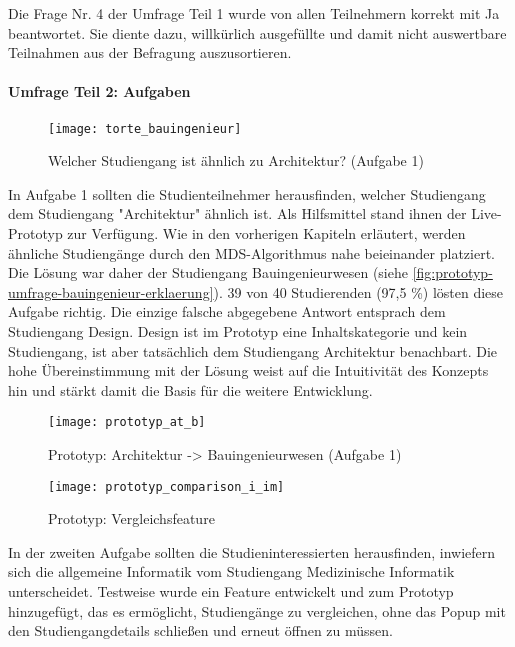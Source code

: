 Die Frage Nr. 4 der Umfrage Teil 1 wurde von allen Teilnehmern korrekt mit \glqq Ja\grqq{} beantwortet. Sie diente dazu, willkürlich ausgefüllte und damit nicht auswertbare Teilnahmen aus der Befragung auszusortieren.

\paragraph{Umfrage Teil 2: Aufgaben}

\begin{figure}[H]
    \centering
    \texttt{[image: torte\_bauingenieur]}
    \caption{Welcher Studiengang ist ähnlich zu Architektur? (Aufgabe 1)}
    \label{fig:prototyp-umfrage-bauingenieur}
\end{figure}

In Aufgabe 1 sollten die Studienteilnehmer herausfinden, welcher Studiengang dem Studiengang "Architektur" ähnlich ist. Als Hilfsmittel stand ihnen der Live-Prototyp zur Verfügung. Wie in den vorherigen Kapiteln erläutert, werden ähnliche Studiengänge durch den MDS-Algorithmus nahe beieinander platziert. Die Lösung war daher der Studiengang \glqq Bauingenieurwesen\grqq{} (siehe \autoref{fig:prototyp-umfrage-bauingenieur-erklaerung}). 39 von 40 Studierenden (97,5 \%) lösten diese Aufgabe richtig. Die einzige falsche abgegebene Antwort entsprach dem Studiengang \glqq Design\grqq{}. \glqq Design\grqq{} ist im Prototyp eine Inhaltskategorie und kein Studiengang, ist aber tatsächlich dem Studiengang \glqq Architektur\grqq{} benachbart. Die hohe Übereinstimmung mit der Lösung weist auf die Intuitivität des Konzepts hin und stärkt damit die Basis für die weitere Entwicklung.

\begin{figure}[H]
    \centering
    \texttt{[image: prototyp\_at\_b]}
    \caption{Prototyp: Architektur -> Bauingenieurwesen (Aufgabe 1)}
    \label{fig:prototyp-umfrage-bauingenieur-erklaerung}
\end{figure}


\begin{figure}[H]
    \centering
    \texttt{[image: prototyp\_comparison\_i\_im]}
    \caption{Prototyp: Vergleichsfeature}
    \label{fig:prototyp-comparison}
\end{figure}

In der zweiten Aufgabe sollten die Studieninteressierten herausfinden, inwiefern sich die allgemeine Informatik vom Studiengang Medizinische Informatik unterscheidet. Testweise wurde ein Feature entwickelt und zum Prototyp hinzugefügt, das es ermöglicht, Studiengänge zu vergleichen, ohne das Popup mit den Studiengangdetails schließen und erneut öffnen zu müssen.

